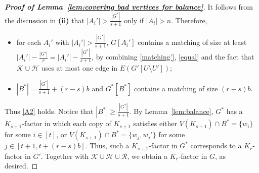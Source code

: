 \documentclass[11pt, a4paper]{article}
\theoremstyle{definition}
\newcommand{\<}{\subseteq}
\begin{document}
\begin{proof}[{\bf Proof of Lemma~\ref{lem:covering bad vertices for balance}}]


It follows from the discussion in \textbf{(ii)} that $|A_i'|>\frac{|G^*|}{s+1}$ only if $|A_i|>n$. 
Therefore,  
\begin{itemize}    
\item\label{C2} for each $A_i'$ with $|A_i'|>\frac{|G^*|}{s+1}$, $G[A_i']$ contains a matching of size at least $|A_i'|-\frac{|G'|}{r}= |A_i'|-\frac{|G^*|}{s+1}$, {by combining \eqref{matching'}, \eqref{equal} and the fact that $\mathcal{K}\cup \mathcal{H}$ uses at most one edge in $E(G'[U\setminus U'])$};
    \item $|B^*|= \frac{|G^*|}{s+1}+(r-s)b$ and $G^*[B^*]$ contains a matching of size $(r-s)b$. %
\end{itemize}
Thus \ref{A2} holds. Notice that $|B^*|\geq  \frac{|G^*|}{s+1}$. By Lemma~\ref{lem:balance}, $G^*$ has a  $K_{s+1}$-factor in which each copy of $K_{s+1}$ satisfies either $V(K_{s+1})\cap B^*=\{w_i\}$ for some $i\in [t]$,  or $V(K_{s+1})\cap B^*=\{w_j,w_j'\}$ for some $j\in [t+1,t+(r-s)b]$. Thus, such a $K_{s+1}$-factor in $G^*$ corresponds to a $K_r$-factor in $G'$. 
Together with $\mathcal{K}\cup \mathcal{H}\cup \mathcal{R}$, we obtain a $K_r$-factor in $G$, as desired.   %
\end{proof}
\end{document}
